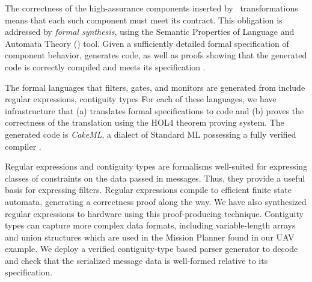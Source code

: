 The correctness of the high-assurance components inserted
by \briefcase \ transformations means that each such component
must meet its \agree{} contract. This obligation is addressed by
\emph{formal synthesis}, using the Semantic Properties of Language
and Automata Theory (\splat) tool.  Given a sufficiently detailed formal
specification of component behavior, \splat{} generates code,
as well as proofs showing that the generated code is
correctly compiled and meets its specification \cite{case-models-2021}.

The formal languages that filters, gates, and monitors are generated
from include regular expressions, contiguity types
For each of these languages, we have infrastructure
that (a) translates formal specifications to code and (b) proves the
correctness of the translation using the HOL4 theorem proving system.
The generated code is \emph{CakeML}, a dialect of Standard ML
possessing a fully verified compiler \cite{cakeml}.


Regular expressions and contiguity types are formalisms well-suited
for expressing classes of constraints on the data passed in
messages. Thus, they provide a useful basis for expressing
filters. Regular expressions compile to efficient finite state
automata, generating a correctness proof along the way.
We have also synthesized regular
expressions to hardware using this proof-producing
technique.
Contiguity types can capture more complex
data formats, including variable-length arrays and union structures
which are used in the Mission Planner found in our UAV example.
We deploy a verified contiguity-type based parser generator
to decode and check that the serialized message data is well-formed
relative to its specification.

